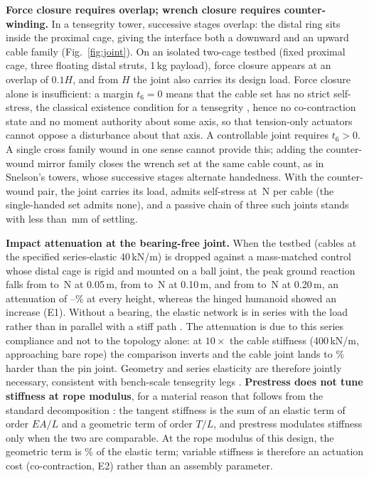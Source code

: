 \documentclass[letterpaper, 10pt, conference]{ieeeconf}
\begin{document}
\textbf{Force closure requires overlap; wrench closure requires
counter-winding.} In a tensegrity tower, successive stages overlap: the
distal ring sits inside the proximal cage, giving the interface both a
downward and an upward cable family (Fig.~\ref{fig:joint}). On an isolated
two-cage testbed (fixed proximal cage, three floating distal struts, 1\,kg
payload), force closure appears at an overlap of $0.1H$, and from
\jointOverlapFrac$H$ the joint also carries its design load. Force closure alone is insufficient: a margin $t_6=0$ means that the
cable set has no strict self-stress, the classical existence condition for
a tensegrity \cite{calladine1978tensegrity}, hence no co-contraction state
and no moment authority about some axis, so that tension-only actuators
cannot oppose a disturbance about that axis. A controllable joint requires
$t_6>0$. A single cross family wound in one sense cannot provide this;
adding the counter-wound mirror family closes the wrench set at the same
cable count, as in Snelson's towers, whose successive stages alternate handedness.
With the counter-wound pair, the joint carries its load, admits
self-stress at \cocontractN\,N per cable (the single-handed set admits
none), and a passive chain of three such joints stands with less than
\chainSag\,mm of settling.

\textbf{Impact attenuation at the bearing-free joint.} When the testbed
(cables at the specified series-elastic 40\,kN/m) is dropped against a
mass-matched control whose distal cage is rigid and mounted on a ball
joint, the peak ground reaction falls from \jointImpactPinFive{} to
\jointImpactCableFive\,N at 0.05\,m, from \jointImpactPinTen{} to
\jointImpactCableTen\,N at 0.10\,m, and from \jointImpactPinTwenty{} to
\jointImpactCableTwenty\,N at 0.20\,m, an attenuation of
\jointImpactLo--\jointImpactHi\% at every height, whereas the hinged
humanoid showed an increase (E1). Without a bearing, the elastic network is in series with the load
rather than in parallel with a stiff path \cite{sabelhaus2015superball}.
The attenuation is due to this series compliance and not to the topology
alone: at $10\times$ the cable stiffness (400\,kN/m, approaching bare
rope) the comparison inverts and the cable joint lands \stiffSensTenLo{}
to \stiffSensTenHi\% harder than the pin joint. Geometry and series
elasticity are therefore jointly necessary, consistent with bench-scale
tensegrity legs \cite{mortensen2025leg}.
\textbf{Prestress does not tune stiffness at rope modulus}, for a material reason
that follows from the standard decomposition \cite{guest2006stiffness}:
the tangent stiffness is the sum of an elastic term of order $EA/L$ and a
geometric term of order $T/L$, and prestress modulates stiffness only when
the two are comparable. At the rope modulus of this design, the geometric
term is \jointGeomElasticRope\% of the elastic term; variable stiffness is
therefore an actuation cost (co-contraction, E2) rather than an assembly
parameter.
\end{document}
